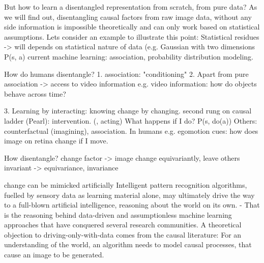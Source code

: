 
	But how to learn a disentangled representation from scratch, \ie from pure data?
	As we will find out, disentangling causal factors from raw image data, without any side information is impossible theoretically and can only work based on statistical assumptions.
	Lets consider an example to illustrate this point:
	Statistical residues -> will depends on statistical nature of data (e.g. Gaussian with two dimensions P(s, a)
	current machine learning: association, probability distribution modeling.


	How do humans disentangle?
	1. association: "conditioning"
	2. Apart from pure association -> access to video information
	e.g. video information: how do objects behave across time?

	3. Learning by interacting: knowing change by changing.
	second rung on causal ladder (Pearl): intervention. (, acting) What happens if I do?
	P(s, do(a))
	Others: counterfactual (imagining), association.
	In humans e.g. egomotion cues: how does image on retina change if I move.


	How disentangle?
	change factor -> image change equivariantly, leave others invariant
	-> equivariance, invariance

	change can be mimicked artificially
Intelligent pattern recognition algorithms, fuelled by sensory data as learning material alone, may ultimately drive the way to a full-blown artificial intelligence, reasoning about the world on its own. - That is the reasoning behind data-driven and assumptionless machine learning approaches that have conquered several research communities.
	A theoretical objection to driving-only-with-data comes from the causal literature: For an understanding of the world, an algorithm needs to model causal processes, that cause an image to be generated.


